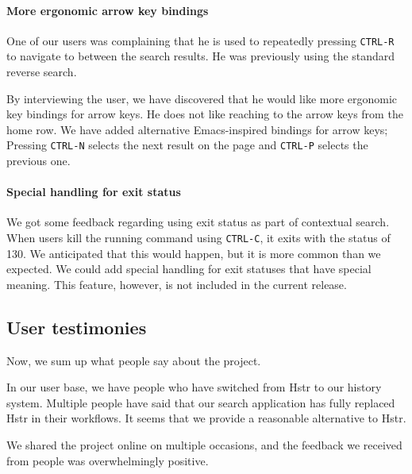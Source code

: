 \paragraph{More ergonomic arrow key bindings}

One of our users was complaining that he is used to repeatedly pressing \verb|CTRL-R| to navigate to between the search results. He was previously using the standard reverse search.

By interviewing the user, we have discovered that he would like more ergonomic key bindings for arrow keys. He does not like reaching to the arrow keys from the home row. We have added alternative Emacs-inspired bindings for arrow keys; Pressing \verb|CTRL-N| selects the next result on the page and \verb|CTRL-P| selects the previous one. 


\paragraph{Special handling for exit status}

We got some feedback regarding using exit status as part of contextual search. When users kill the running command using \verb|CTRL-C|, it exits with the status of 130.
We anticipated that this would happen, but it is more common than we expected.
We could add special handling for exit statuses that have special meaning. This feature, however, is not included in the current release.



\subsection{User testimonies}

Now, we sum up what people say about the project. 

In our user base, we have people who have switched from Hstr to our history system. Multiple people have said that our search application has fully replaced Hstr in their workflows. It seems that we provide a reasonable alternative to Hstr.

We shared the project online on multiple occasions, and the feedback we received from people was overwhelmingly positive.\cite{resh-feedback}\cite{resh-feedback2}

